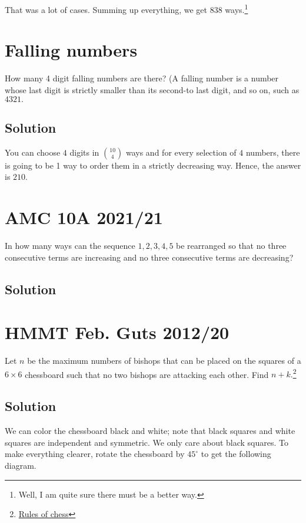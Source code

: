 \documentclass[blue,onecol]{shooting}
\begin{document}
That was a lot of cases. Summing up everything, we get $838$ ways.\footnote{Well, I am quite sure there must be a better way.} 

\section{Falling numbers}

How many 4 digit falling numbers are there? (A falling number is a number whose last digit is strictly smaller than its second-to last digit, and so on, such as $4321.$

\subsection{Solution}

You can choose $4$ digits in $\binom{10}{4}$ ways and for every selection of $4$ numbers, there is going to be 1 way to order them in a strictly decreasing way. Hence, the answer is $210.$

\section{AMC 10A 2021/21}

In how many ways can the sequence $1, 2, 3, 4, 5$ be rearranged so that no three consecutive terms are increasing and no three consecutive terms are decreasing?

\subsection{Solution}

\section{HMMT Feb. Guts 2012/20}

Let $n$ be the maximum numbers of bishops that can be placed on the squares of a $6\times 6$ chessboard such that no two bishops are attacking each other. Find $n+k.$\footnote{\href{https://www.ichess.net/blog/chess-pieces-moves/}{Rules of chess}}

\subsection{Solution}

We can color the chessboard black and white; note that black squares and white squares are independent and symmetric. We only care about black squares. To make everything clearer, rotate the chessboard by $45^{\circ}$ to get the following diagram.
\end{document}

